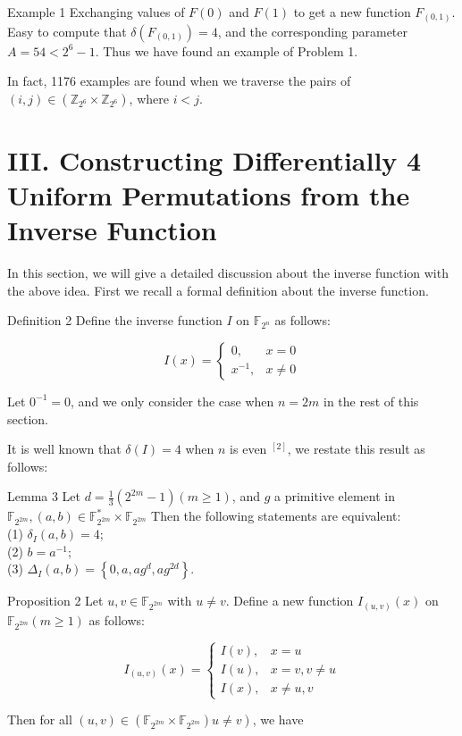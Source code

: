 \documentclass[10pt]{article}
\begin{document}
Example 1 Exchanging values of $F(0)$ and $F(1)$ to get a new function $F_{(0,1)}$. Easy to compute that $\delta\left(F_{(0,1)}\right)=4$, and the corresponding parameter $A=54<2^{6}-1$. Thus we have found an example of Problem 1.

In fact, 1176 examples are found when we traverse the pairs of $(i, j) \in\left(\mathbb{Z}_{2^{6}} \times \mathbb{Z}_{2^{6}}\right)$, where $i<j$.

\section*{III. Constructing Differentially 4 Uniform Permutations from the Inverse Function}
In this section, we will give a detailed discussion about the inverse function with the above idea. First we recall a formal definition about the inverse function.

Definition 2 Define the inverse function $I$ on $\mathbb{F}_{2^{n}}$ as follows:

$$
I(x)= \begin{cases}0, & x=0 \\ x^{-1}, & x \neq 0\end{cases}
$$

Let $0^{-1}=0$, and we only consider the case when $n=2 m$ in the rest of this section.

It is well known that $\delta(I)=4$ when $n$ is even ${ }^{[2]}$, we restate this result as follows:

Lemma 3 Let $d=\frac{1}{3}\left(2^{2 m}-1\right)(m \geq 1)$, and $g$ a primitive element in $\mathbb{F}_{2^{2 m}},(a, b) \in \mathbb{F}_{2^{2 m}}^{*} \times \mathbb{F}_{2^{2 m}}$ Then the following statements are equivalent:\\
(1) $\delta_{I}(a, b)=4$;\\
(2) $b=a^{-1}$;\\
(3) $\Delta_{I}(a, b)=\left\{0, a, a g^{d}, a g^{2 d}\right\}$.

Proposition 2 Let $u, v \in \mathbb{F}_{2^{2 m}}$ with $u \neq v$. Define a new function $I_{(u, v)}(x)$ on $\mathbb{F}_{2^{2 m}}(m \geq 1)$ as follows:

$$
I_{(u, v)}(x)= \begin{cases}I(v), & x=u \\ I(u), & x=v, v \neq u \\ I(x), & x \neq u, v\end{cases}
$$

Then for all $\left.(u, v) \in\left(\mathbb{F}_{2^{2 m}} \times \mathbb{F}_{2^{2 m}}\right) u \neq v\right)$, we have
\end{document}
